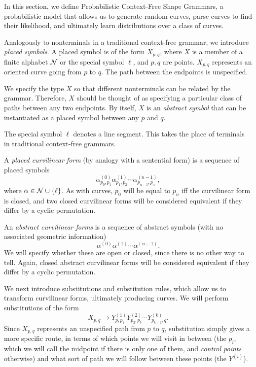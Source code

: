 

In this section, we define Probabilistic Context-Free Shape Grammars,
a probabilistic model that allows us to generate random curves, parse
curves to find their likelihood, and ultimately learn distributions
over a class of curves.

Analogously to nonterminals in a traditional context-free grammar, we
introduce {\em placed symbols}. A placed symbol is of the form
$X_{p,q}$, where $X$ is a member of a finite alphabet ${\mathcal N}$ or the
special symbol $\ell$, and $p,q$ are points. $X_{p,q}$ represents an
oriented curve going from $p$ to $q$. The path between the endpoints
is unspecified.

We specify the type $X$ so that different nonterminals can be related
by the grammar. Therefore, $X$ should be thought of as specifying a
particular class of paths between any two endpoints. By itself, $X$ is
an {\em abstract symbol} that can be instantiated as a placed symbol
between any $p$ and $q$.

The special symbol $\ell$ denotes a line segment. This takes the place
of terminals in traditional context-free grammars.

\begin{defn}
A {\em placed curvilinear form} (by analogy with a sentential form) is
a sequence of placed symbols
$$ \alpha^{(0)}_{p_0,p_1} \alpha^{(1)}_{p_1,p_2} \cdots
\alpha^{(n-1)}_{p_{n-1},{p_n}},$$ where $\alpha \in {\mathcal N} \cup \{\ell
\}$.  As with curves, $p_0$ will be equal to $p_n$ iff the curvilinear
form is closed, and two closed curvilinear forms will be considered
equivalent if they differ by a cyclic permutation.

An {\em abstract curvilinear forms} is a sequence of abstract symbols
(with no associated geometric information)
$$ \alpha^{(0)} \alpha^{(1)} \cdots \alpha^{(n-1)}.$$ We will specify
whether these are open or closed, since there is no other way to
tell. Again, closed abstract curvilinear forms will be considered
equivalent if they differ by a cyclic permutation.
\end{defn}

We next introduce substitutions and substitution rules, which allow us
to transform curvilinear forms, ultimately producing curves. We will
perform substitutions of the form
$$ X_{p,q} \to Y^{(1)}_{p,p_1} Y^{(2)}_{p_2,p_3} \cdots
Y^{(k)}_{p_{k-1},q}.$$ Since $X_{p,q}$ represents an unspecified path
from $p$ to $q$, substitution simply gives a more specific route, in
terms of which points we will visit in between (the $p_i$, which we
will call the midpoint if there is only one of them, and {\em control
  points} otherwise) and what sort of path we will follow between
these points (the $Y^{(i)}$).

